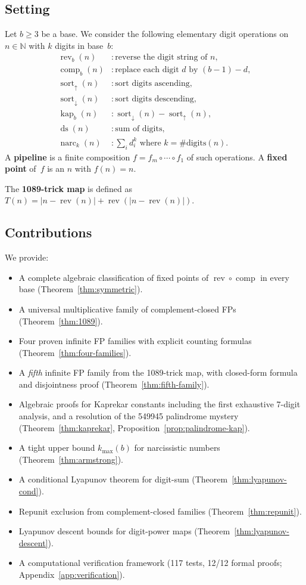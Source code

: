 \documentclass[11pt,a4paper]{amsart}
\theoremstyle{plain}
\theoremstyle{definition}
\theoremstyle{remark}
\DeclareMathOperator{\rev}{rev}
\DeclareMathOperator{\comp}{comp}
\DeclareMathOperator{\sort}{sort}
\DeclareMathOperator{\kap}{kap}
\DeclareMathOperator{\ds}{ds}
\DeclareMathOperator{\narc}{narc}
\begin{document}
\subsection{Setting}
Let $b \geq 3$ be a base. We consider the following elementary digit operations
on $n \in \mathbb{N}$ with $k$ digits in base~$b$:
\begin{align*}
\rev_b(n)        &: \text{reverse the digit string of } n, \\
\comp_b(n)       &: \text{replace each digit } d \text{ by } (b{-}1)-d, \\
\sort_\uparrow(n)   &: \text{sort digits ascending}, \\
\sort_\downarrow(n)  &: \text{sort digits descending}, \\
\kap_b(n)        &: \sort_\downarrow(n) - \sort_\uparrow(n), \\
\ds(n)           &: \text{sum of digits}, \\
\narc_k(n)       &: \textstyle\sum_i d_i^k \text{ where } k = \#\text{digits}(n).
\end{align*}
A \textbf{pipeline} is a finite composition $f = f_m \circ \cdots \circ f_1$
of such operations. A \textbf{fixed point} of~$f$ is an $n$ with $f(n) = n$.

The \textbf{1089-trick map} is defined as
$T(n) = |n - \rev(n)| + \rev(|n - \rev(n)|)$.

\subsection{Contributions}
We provide:
\begin{itemize}
\item A complete algebraic classification of fixed points of
  $\rev \circ \comp$ in every base (Theorem~\ref{thm:symmetric}).
\item A universal multiplicative family of complement-closed FPs
  (Theorem~\ref{thm:1089}).
\item Four proven infinite FP families with explicit counting formulas
  (Theorem~\ref{thm:four-families}).
\item A \emph{fifth} infinite FP family from the 1089-trick map, with
  closed-form formula and disjointness proof
  (Theorem~\ref{thm:fifth-family}).
\item Algebraic proofs for Kaprekar constants including the first exhaustive
  7-digit analysis, and a resolution of the 549945 palindrome mystery
  (Theorem~\ref{thm:kaprekar}, Proposition~\ref{prop:palindrome-kap}).
\item A tight upper bound $k_{\max}(b)$ for narcissistic numbers
  (Theorem~\ref{thm:armstrong}).
\item A conditional Lyapunov theorem for digit-sum
  (Theorem~\ref{thm:lyapunov-cond}).
\item Repunit exclusion from complement-closed families
  (Theorem~\ref{thm:repunit}).
\item Lyapunov descent bounds for digit-power maps
  (Theorem~\ref{thm:lyapunov-descent}).
\item A computational verification framework (117 tests, 12/12 formal proofs;
  Appendix~\ref{app:verification}).
\end{itemize}
\end{document}

